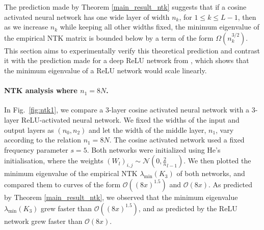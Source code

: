 \documentclass{article}
\theoremstyle{plain}
\theoremstyle{definition}
\theoremstyle{remark}
\begin{document}
The prediction made by Theorem \ref{main_result_ntk} suggests that if a cosine activated neural network has one wide layer of width $n_k$, for $1 \leq k \leq L-1$, 
then as we increase $n_k$ while keeping all other widths fixed,
the minimum eigenvalue of the empirical NTK matrix is bounded below by a term of the 
form $\Omega(n_k^{3/2})$. 
This section aims to experimentally verify this theoretical
prediction and contrast it with the prediction made for a deep ReLU network from 
\cite{nguyen2021tight}, which shows that the minimum eigenvalue of a ReLU network would scale linearly.


\paragraph{NTK analysis where $n_1 = 8N$.} In Fig.~\ref{fig:ntk1}, we compare a 3-layer cosine activated neural network with a 3-layer ReLU-activated neural network. We fixed the widths of the input and output layers as $(n_0, n_2)$ and let the width of the middle layer, $n_1$, vary according to the relation $n_1 = 8N$. The cosine activated network used a fixed frequency parameter $s = 5$. Both networks were initialized using He's initialisation, where the weights
$(W_l)_{i,j} \sim \mathcal{N}(0, \frac{2}n_{l-1})$. We then plotted the minimum eigenvalue of the
empirical NTK
$\lambda_{\min}(K_3)$ of both networks, and compared them to curves of the form
$\mathcal{O}((8x)^{1.5})$ and $\mathcal{O}(8x)$.
As predicted by Theorem \ref{main_result_ntk}, we observed that the minimum eigenvalue $\lambda_{\min}(K_3)$ grew faster than $\mathcal{O}((8x)^{1.5})$, and as predicted by 
\cite{nguyen2021tight} the ReLU network grew faster than $\mathcal{O}(8x)$. 
\end{document}
